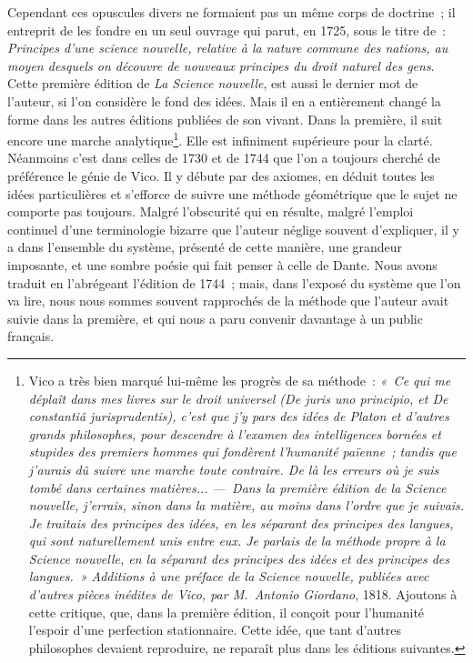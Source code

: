 \documentclass[french,twoside]{book} %
\begin{document}
Cependant ces opuscules divers ne formaient pas un même corps de doctrine ; il entreprit de les fondre en un seul ouvrage qui parut, en 1725, sous le titre de : {\itshape Principes d’une science nouvelle, relative à la nature commune des nations, au moyen desquels on découvre de nouveaux principes du droit naturel des gens}. Cette première édition de {\itshape La Science nouvelle}, est aussi le dernier mot de l’auteur, si l’on considère le fond des idées. Mais il en a entièrement changé la forme dans les autres éditions publiées de son vivant. Dans la première, il suit encore une marche analytique\footnote{Vico a très bien marqué lui-même les progrès de sa méthode : \emph{« Ce qui me déplaît dans mes livres sur le droit universel ({\itshape De juris uno principio}, et {\itshape De constantiâ jurisprudentis}), c’est que j’y pars des idées de Platon et d’autres grands philosophes, pour descendre à l’examen des intelligences bornées et stupides des premiers hommes qui fondèrent l’humanité païenne ; tandis que j’aurais dû suivre une marche toute contraire. De là les erreurs où je suis tombé dans certaines matières... — Dans la première édition de la Science nouvelle, j’errais, sinon dans la matière, au moins dans l’ordre que je suivais. Je traitais des principes des idées, en les séparant des principes des langues, qui sont naturellement unis entre eux. Je parlais de la méthode propre à la Science nouvelle, en la séparant des principes des idées et des principes des langues. »} {\itshape Additions à une préface de la Science nouvelle, publiées avec d’autres pièces inédites de Vico, par M. Antonio Giordano}, 1818. Ajoutons à cette critique, que, dans la première édition, il conçoit pour l’humanité l’espoir d’une perfection stationnaire. Cette idée, que tant d’autres philosophes devaient reproduire, ne reparaît plus dans les éditions suivantes.}. Elle est infiniment  supérieure pour la clarté. Néanmoins c’est dans celles de 1730 et de 1744 que l’on a toujours cherché de préférence le génie de Vico. Il y débute par des axiomes, en déduit toutes les idées particulières et s’efforce de suivre une méthode géométrique que le sujet ne comporte pas toujours. Malgré l’obscurité qui en résulte, malgré l’emploi continuel d’une terminologie bizarre que l’auteur néglige souvent d’expliquer, il y a dans l’ensemble du système, présenté de cette manière, une grandeur imposante, et une sombre poésie qui fait penser à celle de Dante. Nous avons traduit en l’abrégeant l’édition de 1744 ; mais, dans l’exposé du système que l’on va lire, nous nous sommes souvent rapprochés de la méthode que l’auteur avait suivie dans la première, et qui nous a paru convenir davantage à un public français.\par
\end{document}

